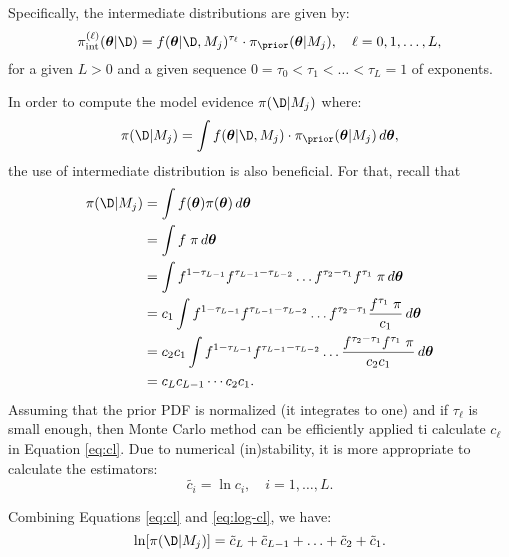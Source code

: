 Specifically, the
intermediate distributions are given by:
\begin{equation}
\label{eq:intermediate_dist}
\pi_\text{int}^{(\ell)} (\bv{\theta}|\D) = f(\bv{\theta}|\D, M_j)^{\tau_\ell} \cdot \pi_\prior (\bv{\theta} | M_j), \quad \ell=0,1,\ldots,L,
\end{equation}
for a given $L > 0$ and a given sequence $0 = \tau_0 < \tau_1 < \ldots < \tau_L = 1$ of exponents.


 

In order to compute the model evidence $\pi( \D |M_j)$ where:
\begin{equation}
 \label{eq:evidence}
 \pi( \D |M_j)=\int f(\bv{\theta}|\D, M_j) \cdot \pi_\prior (\bv{\theta}|M_j) \, d\bv{\theta}, 
\end{equation}
the use of intermediate distribution is also beneficial.
For that, recall that
\begin{equation}
\label{eq:cl}
\begin{split}
 \pi( \D |M_j) &= \int f(\bv{\theta})\pi (\bv{\theta}) \, d\bv{\theta} \\
  &= \int f \; \pi \, d\bv{\theta} \\
  &= \int f^{1-\tau_{L-1}} f^{\tau_{L-1}-\tau_{L-2}}\ldots f^{\tau_2-\tau_1} f^{\tau_1}\; \pi \, d\bv{\theta} \\
  &= c_1 \int f^{1-\tau_{L-1}} f^{\tau_{L-1}-\tau_{L-2}}\ldots f^{\tau_2-\tau_1} \dfrac{f^{\tau_1}\; \pi}{c_1} \, d\bv{\theta} \\
  &= c_2 c_1 \int f^{1-\tau_{L-1}} f^{\tau_{L-1}-\tau_{L-2}}\ldots  \dfrac{f^{\tau_2-\tau_1} f^{\tau_1}\; \pi}{c_2 c_1} \, d\bv{\theta} \\
  &= c_L c_{L-1} \cdots c_2 c_1.
\end{split}
\end{equation}
Assuming that the prior PDF is normalized (it integrates to one) and if $\tau_{\ell}$ is small enough, then Monte Carlo method can be efficiently applied ti calculate $c_{\ell}$ in Equation \eqref{eq:cl}. Due to numerical (in)stability, it is more appropriate to calculate the estimators:
\begin{equation}
 \label{eq:log-cl}
 \tilde{c_i} = \ln c_i, \quad i=1,\ldots, L.
\end{equation}

Combining Equations \eqref{eq:cl} and \eqref{eq:log-cl}, we have:
\begin{equation*}
 \ln[\pi( \D |M_j)] = \tilde{c}_{L}+\tilde{c}_{L-1}+\ldots+\tilde{c}_2+\tilde{c}_1.
\end{equation*}



